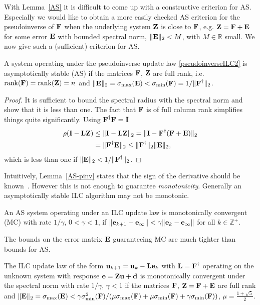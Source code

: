 With Lemma~\ref{AS} it is difficult to come up with a constructive criterion for AS. Especially we would like to obtain a more easily checked AS criterion for the pseudoinverse of $\boldsymbol{\mathrm{F}}$ when the underlying system $\boldsymbol{\mathrm{Z}}$ is close to $\boldsymbol{\mathrm{F}}$, e.g. $\boldsymbol{\mathrm{Z}} = \boldsymbol{\mathrm{F}} + \boldsymbol{\mathrm{E}}$ for some error $\boldsymbol{\mathrm{E}}$ with bounded spectral norm, $\|\boldsymbol{\mathrm{E}}\|_2 < M$, with $M \in \mathbb{R}$ small. We now give such a (sufficient) criterion for AS.
%
\begin{lem}\label{AS-pinv}
A system operating under the pseudoinverse update law \eqref{pseudoinverseILC2} is asymptotically stable (AS) if the matrices $\boldsymbol{\mathrm{F}}$, $\boldsymbol{\mathrm{Z}}$ are full rank, i.e. $\mathrm{rank}(\boldsymbol{\mathrm{F}}) = \mathrm{rank}(\boldsymbol{\mathrm{Z}}) = n$ and $\|\boldsymbol{\mathrm{E}}\|_2 = \sigma_{\mathrm{max}}(\boldsymbol{\mathrm{E}}) < \sigma_{\mathrm{min}}(\boldsymbol{\mathrm{F}}) = 1/\|\boldsymbol{\mathrm{F}}^{\dagger}\|_2$.
\end{lem}
%
\begin{proof}
It is sufficient to bound the spectral radius with the spectral norm and show that it is less than one. The fact that $\boldsymbol{\mathrm{F}}$ is of full column rank simplifies things quite significantly. Using $\boldsymbol{\mathrm{F}}^{\dagger}\boldsymbol{\mathrm{F}} = \boldsymbol{\mathrm{I}}$
%
\begin{align}
\rho(\boldsymbol{\mathrm{I}} - \boldsymbol{\mathrm{L}}\boldsymbol{\mathrm{Z}}) &\leq \|\boldsymbol{\mathrm{I}} - \boldsymbol{\mathrm{L}}\boldsymbol{\mathrm{Z}}\|_2 = \|\boldsymbol{\mathrm{I}} - \boldsymbol{\mathrm{F}}^{\dagger}(\boldsymbol{\mathrm{F}} + \boldsymbol{\mathrm{E}})\|_2 \\
&= \|\boldsymbol{\mathrm{F}}^{\dagger}\boldsymbol{\mathrm{E}}\|_2 \leq \|\boldsymbol{\mathrm{F}}^{\dagger}\|_2\|\boldsymbol{\mathrm{E}}\|_2,
\end{align}
%
which is less than one if $\|\boldsymbol{\mathrm{E}}\|_2 < 1/\|\boldsymbol{\mathrm{F}}^{\dagger}\|_2$.
\end{proof}
%
Intuitively, Lemma~\ref{AS-pinv} states that the sign of the derivative should be known~\cite{Kolter09}. However this is not enough to guarantee \emph{monotonicity}. Generally an asymptotically stable ILC algorithm may not be monotonic.
%
\begin{defn}
An AS system operating under an ILC update law is monotonically convergent (MC) with rate $1/\gamma$, $0 < \gamma < 1$, if $\|\boldsymbol{\mathrm{e}}_{k+1} - \boldsymbol{\mathrm{e}}_{\infty}\| < \gamma \|\boldsymbol{\mathrm{e}}_{k} - \boldsymbol{\mathrm{e}}_{\infty}\|$ for all $k \in \mathbb{Z}^{+}$.
\end{defn}
%
The bounds on the error matrix $\boldsymbol{\mathrm{E}}$ guaranteeing MC are much tighter than bounds for AS.
%
\begin{lem} The ILC update law of the form $\boldsymbol{\mathrm{u}}_{k+1} = \boldsymbol{\mathrm{u}}_{k} - \boldsymbol{\mathrm{L}} \boldsymbol{\mathrm{e}}_{k}$ with $\boldsymbol{\mathrm{L}} = \boldsymbol{\mathrm{F}}^{\dagger}$ operating on the unknown system with response $\boldsymbol{\mathrm{e}} = \boldsymbol{\mathrm{Z}} \boldsymbol{\mathrm{u}} + \boldsymbol{\mathrm{d}}$ is monotonically convergent under the spectral norm with rate $1/\gamma$, $\gamma < 1$ if the matrices $\boldsymbol{\mathrm{F}}$, $\boldsymbol{\mathrm{Z}} = \boldsymbol{\mathrm{F}} + \boldsymbol{\mathrm{E}}$ are full rank and $\|\boldsymbol{\mathrm{E}}\|_2 = \sigma_{\mathrm{max}}(\boldsymbol{\mathrm{E}}) < \gamma\sigma_{\mathrm{min}}^{2}(\boldsymbol{\mathrm{F}})/(\mu\sigma_{\mathrm{max}}(\boldsymbol{\mathrm{F}}) + \mu\sigma_{\mathrm{min}}(\boldsymbol{\mathrm{F}}) + \gamma\sigma_{\mathrm{min}}(\boldsymbol{\mathrm{F}}))$, $\mu = \frac{1 + \sqrt{5}}{2}$.  \end{lem}
